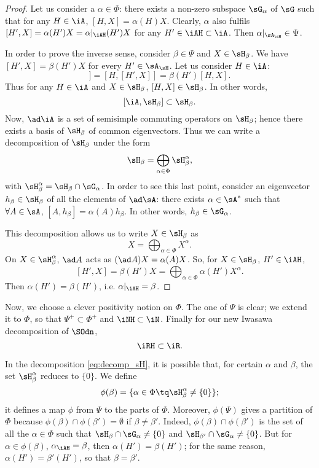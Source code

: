 \begin{proof}
Let us consider a $\alpha\in\Phi$: there exists a non-zero subspace $\sG_{\alpha}$ of $\sG$ such that for any $H\in\iA$, $[H,X]=\alpha(H)X$. Clearly, $\alpha$ also fulfils $[H',X]=\alpha(H')X=\alpha|_{\iAH}(H')X$ for any $H'\in\iAH\subset\iA$. Then $\alpha|_{\sA_{\sH}}\in\Psi$.

In order to prove the inverse sense, consider $\beta\in\Psi$ and $X\in\sH_{\beta}$. We have $[H',X]=\beta(H')X$ for every $H'\in\sA_{\sH}$. Let us consider $H\in\iA$: 
\begin{equation}
  [H',[H,X]]=[H,[H',X]]
            =\beta(H')[H,X].
\end{equation}
Thus for any $H\in\iA$ and $X\in\sH_{\beta}$, $[H,X]\in\sH_{\beta}$. In other words,
\[  
   [\iA,\sH_{\beta}]\subset\sH_{\beta}.
\]
Now, $\ad\iA$ is a set of semisimple commuting operators on $\sH_{\beta}$; hence there exists a basis of $\sH_{\beta}$ of common eigenvectors. Thus we can write a decomposition of $\sH_{\beta}$ under the form
\begin{equation}\label{eq:decomp_sH}
 \sH_{\beta}=\bigoplus_{\alpha\in\Phi}\sH_{\beta}^{\alpha},
\end{equation}
with $\sH_{\beta}^{\alpha}=\sH_{\beta}\cap\sG_{\alpha}$. In order to see this last point, consider an eigenvector $h_{\beta}\in\sH_{\beta}$ of all the elements of $\ad\sA$: there exists $\alpha\in\sA^*$ such that $\forall A\in\sA$, $[A,h_{\beta}]=\alpha(A)h_{\beta}$. In other words, $h_{\beta}\in\sG_{\alpha}$.

This decomposition allows us to write $X\in\sH_{\beta}$ as
\[
    X=\bigoplus_{\alpha\in\Phi}X^{\alpha}.
\]
On $X\in\sH_{\beta}^{\alpha}$, $\ad A$ acts as $(\ad A)X=\alpha(A)X$.  So, for $X\in\sH_{\beta}$, $H'\in\iAH$,
\[
  [H',X]=\beta(H')X=\bigoplus_{\alpha\in\Phi}\alpha(H')X^{\alpha}.
\]
Then $\alpha(H')=\beta(H')$, i.e. $\alpha|_{\iAH}=\beta$.

\end{proof}

Now, we choose a clever positivity notion on $\Phi$. The one of $\Psi$ is clear; we extend it to $\Phi$, so that $\Psi^+\subset\Phi^+$ and $\iNH\subset\iN$. Finally for our new Iwasawa decomposition of $\SOdn$,
\[
   \iRH\subset\iR.
\]

In the decomposition \eqref{eq:decomp_sH}, it is possible that, for certain $\alpha$ and $\beta$, the set $\sH_{\beta}^{\alpha}$ reduces to $\{0\}$. We define
\begin{equation}
  \phi(\beta)=\{ \alpha\in\Phi\tq \sH_{\beta}^{\alpha}\neq\{0\} \};
\end{equation}
it defines a map $\phi$ from $\Psi$ to the parts of $\Phi$. Moreover, $\phi(\Psi)$ gives a partition of $\Phi$ because $\phi(\beta)\cap\phi(\beta')=\emptyset$ if $\beta\neq\beta'$. Indeed, $\phi(\beta)\cap\phi(\beta')$ is the set of all the $\alpha\in\Phi$ such that $\sH_{\beta}\cap\sG_{\alpha}\neq\{0\}$ and $\sH_{\beta'}\cap\sG_{\alpha}\neq\{0\}$. But for $\alpha\in\phi(\beta)$, $\alpha_{\iAH}=\beta$, then $\alpha(H')=\beta(H')$; for the same reason, $\alpha(H')=\beta'(H')$, so that $\beta=\beta'$.

